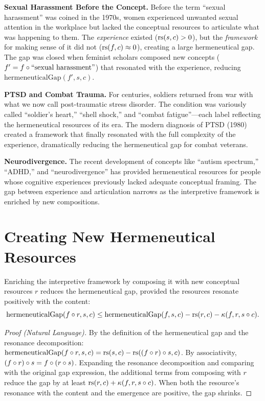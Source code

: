 \begin{remark}
\textbf{Sexual Harassment Before the Concept.} Before the term ``sexual
harassment'' was coined in the 1970s, women experienced unwanted sexual attention
in the workplace but lacked the conceptual resources to articulate what was
happening to them. The \emph{experience} existed ($\mathrm{rs}(s, c) > 0$), but the
\emph{framework} for making sense of it did not ($\mathrm{rs}(f, c) \approx 0$),
creating a large hermeneutical gap. The gap was closed when feminist scholars
composed new concepts ($f' = f \circ \text{``sexual harassment''}$) that
resonated with the experience, reducing $\mathrm{hermeneuticalGap}(f', s, c)$.

\textbf{PTSD and Combat Trauma.} For centuries, soldiers returned from war
with what we now call post-traumatic stress disorder. The condition was variously
called ``soldier's heart,'' ``shell shock,'' and ``combat fatigue''---each label
reflecting the hermeneutical resources of its era. The modern diagnosis of PTSD
(1980) created a framework that finally resonated with the full complexity of
the experience, dramatically reducing the hermeneutical gap for combat veterans.

\textbf{Neurodivergence.} The recent development of concepts like ``autism
spectrum,'' ``ADHD,'' and ``neurodivergence'' has provided hermeneutical
resources for people whose cognitive experiences previously lacked adequate
conceptual framing. The gap between experience and articulation narrows as
the interpretive framework is enriched by new compositions.
\end{remark}

\section{Creating New Hermeneutical Resources}

\begin{theorem}
\label{thm:framework-enrichment}
Enriching the interpretive framework by composing it with new conceptual resources
$r$ reduces the hermeneutical gap, provided the resources resonate positively
with the content:
\[
  \mathrm{hermeneuticalGap}(f \circ r, s, c) \leq
  \mathrm{hermeneuticalGap}(f, s, c) - \mathrm{rs}(r, c) - \kappa(f, r, s \circ c).
\]
\end{theorem}

\begin{proof}[Proof (Natural Language)]
By the definition of the hermeneutical gap and the resonance decomposition:
$\mathrm{hermeneuticalGap}(f \circ r, s, c) = \mathrm{rs}(s, c) - \mathrm{rs}((f \circ r)
\circ s, c)$. By associativity, $(f \circ r) \circ s = f \circ (r
\circ s)$. Expanding the resonance decomposition and comparing with the
original gap expression, the additional terms from composing with $r$ reduce the
gap by at least $\mathrm{rs}(r, c) + \kappa(f, r, s \circ c)$. When both the
resource's resonance with the content and the emergence are positive, the gap
shrinks.
\end{proof}

